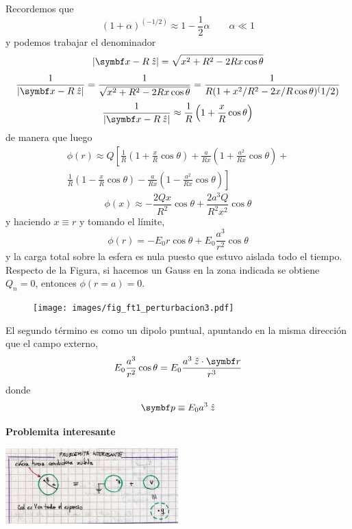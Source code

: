\documentclass[10pt,oneside]{CBFT_book}
\begin{document}
Recordemos que
\[
	(1+\alpha)^{(-1/2)} \approx 1 - \frac{1}{2}\alpha \qquad \alpha \ll 1
\]
y podemos trabajar el denominador
\[
	|\vb{x} - R\zver| = \sqrt{ x^2 + R^2 - 2Rx\cos\theta}
\]
\[
	\frac{1}{|\vb{x} - R\zver|} = \frac{1}{\sqrt{ x^2 + R^2 - 2Rx\cos\theta}} =
	\frac{1}{R(1 + x^2/R^2 - 2x/R\cos\theta)^(1/2)}
\]
\[
	\frac{1}{|\vb{x} - R\zver|} \approx \frac{1}{R}\left(1+ \frac{x}{R} \cos\theta \right)
\]
de manera que luego
\begin{multline*}
	\phi(r) \approx Q\left[ \frac{1}{R}\left(1+ \frac{x}{R} \cos\theta \right) + 
	\frac{a}{Rx}\left(1+ \frac{a^2}{Rx} \cos\theta \right) + \right. \\
	\left. \frac{1}{R}\left(1 - \frac{x}{R} \cos\theta \right) -
	\frac{a}{Rx}\left(1 - \frac{a^2}{Rx} \cos\theta \right) \right]
\end{multline*}
\[
	\phi(x) \approx -\frac{2Qx}{R^2} \cos\theta + \frac{2a^3Q}{R^2x^2}\cos\theta
\]
y haciendo $x\equiv r$ y tomando el límite,
\[
	\phi(r) = -E_0 r \cos\theta + E_0\frac{a^3}{r^2} \cos\theta
\]
y la carga total sobre la esfera es nula puesto que estuvo aislada todo el tiempo.
Respecto de la Figura, si hacemos un Gauss en la zona indicada se obtiene $Q_n=0$,
entonces $\phi(r=a)=0$.

\begin{figure}[htb]
	\begin{center}
	\texttt{[image: images/fig\_ft1\_perturbacion3.pdf]}	 
	\end{center}
	\caption{}
\end{figure}

El segundo término es como un dipolo puntual, apuntando en la misma dirección que el campo
externo,
\[
	E_0\frac{a^3}{r^2} \cos\theta = E_0\frac{a^3 \zver\cdot\vb{r}}{r^3} 
\]
donde
\[
	\vb{p} \equiv E_0 a^3 \zver
\]

\begin{ejemplo}{\bf Problemita interesante}

\includegraphics[width=0.5\textwidth]{images/fig_ft1_comen_green_super_E.jpg}
 
\end{ejemplo}
\end{document}
